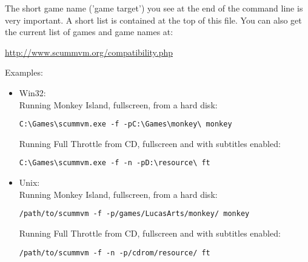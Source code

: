 The short game name ('game target') you see at the end of the command
line is very important. A short list is contained at the top of this
file. You can also get the current list of games and game names at:

\begin{center}
  \url{http://www.scummvm.org/compatibility.php}
\end{center}

Examples:
\begin{itemize}
\item Win32:\\
Running Monkey Island, fullscreen, from a hard disk:
\begin{verbatim}
C:\Games\scummvm.exe -f -pC:\Games\monkey\ monkey
\end{verbatim}
  Running Full Throttle from CD, fullscreen and with subtitles enabled:
\begin{verbatim}
C:\Games\scummvm.exe -f -n -pD:\resource\ ft
\end{verbatim}
 \item Unix:\\
  Running Monkey Island, fullscreen, from a hard disk:
\begin{verbatim}
/path/to/scummvm -f -p/games/LucasArts/monkey/ monkey
\end{verbatim}
  Running Full Throttle from CD, fullscreen and with subtitles enabled:
\begin{verbatim}
/path/to/scummvm -f -n -p/cdrom/resource/ ft
\end{verbatim}
\end{itemize}
